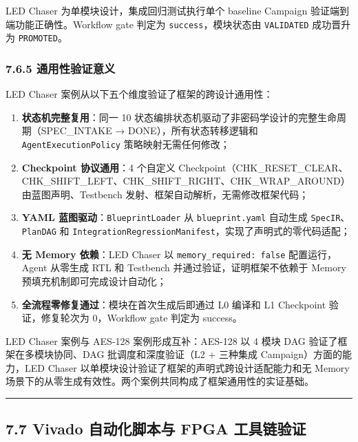 LED Chaser 为单模块设计，集成回归测试执行单个 baseline Campaign
验证端到端功能正确性。Workflow gate 判定为 \texttt{success}，模块状态由
\texttt{VALIDATED} 成功晋升为 \texttt{PROMOTED}。

\subsubsection{7.6.5
通用性验证意义}\label{ux901aux7528ux6027ux9a8cux8bc1ux610fux4e49}

LED Chaser 案例从以下五个维度验证了框架的跨设计通用性：

\begin{enumerate}
\def\labelenumi{\arabic{enumi}.}
\tightlist
\item
  \textbf{状态机完整复用}：同一 10
  状态编排状态机驱动了非密码学设计的完整生命周期（SPEC\_INTAKE →
  DONE），所有状态转移逻辑和 \texttt{AgentExecutionPolicy}
  策略映射无需任何修改；
\item
  \textbf{Checkpoint 协议通用}：4 个自定义
  Checkpoint（CHK\_RESET\_CLEAR、CHK\_SHIFT\_LEFT、CHK\_SHIFT\_RIGHT、CHK\_WRAP\_AROUND）由蓝图声明、Testbench
  发射、框架自动解析，无需修改框架代码；
\item
  \textbf{YAML 蓝图驱动}：\texttt{BlueprintLoader} 从
  \texttt{blueprint.yaml} 自动生成 \texttt{SpecIR}、\texttt{PlanDAG} 和
  \texttt{IntegrationRegressionManifest}，实现了声明式的零代码适配；
\item
  \textbf{无 Memory 依赖}：LED Chaser 以
  \texttt{memory\_required:\ false} 配置运行，Agent 从零生成 RTL 和
  Testbench 并通过验证，证明框架不依赖于 Memory
  预填充机制即可完成设计自动化；
\item
  \textbf{全流程零修复通过}：模块在首次生成后即通过 L0 编译和 L1
  Checkpoint 验证，修复轮次为 0，Workflow gate 判定为 success。
\end{enumerate}

LED Chaser 案例与 AES-128 案例形成互补：AES-128 以 4 模块 DAG
验证了框架在多模块协同、DAG 批调度和深度验证（L2 + 三种集成
Campaign）方面的能力，LED Chaser
以单模块设计验证了框架的声明式跨设计适配能力和无 Memory
场景下的从零生成有效性。两个案例共同构成了框架通用性的实证基础。

\begin{center}\rule{0.5\linewidth}{0.5pt}\end{center}

\subsection{7.7 Vivado 自动化脚本与 FPGA
工具链验证}\label{vivado-ux81eaux52a8ux5316ux811ax672cux4e0e-fpga-ux5de5ux5177ux94feux9a8cux8bc1}

